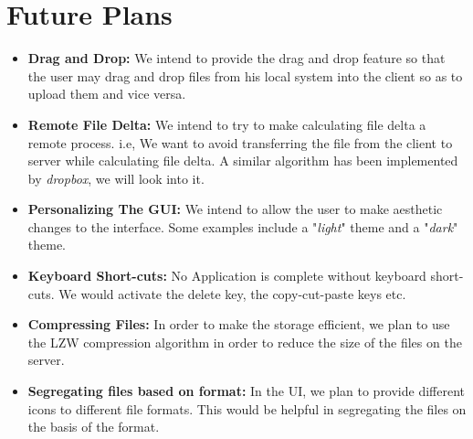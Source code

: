 \documentclass[]{article}
\begin{document}
\section{Future Plans}

\begin{itemize}
\item \textbf{Drag and Drop:} 
We intend to provide the drag and drop feature so that the user may drag and drop files from his local system into the client so as to upload them and vice versa.
\item \textbf{Remote File Delta:}
We intend to try to make calculating file delta a remote process. i.e, We want to avoid transferring the file from the client to server while calculating file delta. A similar algorithm has been implemented by \textit{dropbox}, we will look into it.
\item \textbf{Personalizing The GUI:}
We intend to allow the user to make aesthetic changes to the interface. Some examples include a "\textit{light}" theme and a "\textit{dark}" theme.
\item \textbf{Keyboard Short-cuts:}
No Application is complete without keyboard short-cuts. We would activate the delete key, the copy-cut-paste keys etc.
\item \textbf{Compressing Files:}
In order to make the storage efficient, we plan to use the LZW compression algorithm in order to reduce the size of the files on the server.
\item \textbf{Segregating files based on format:}
In the UI, we plan to provide different icons to different file formats. This would be helpful in segregating the files on the basis of the format. 
\end{itemize}
\end{document}
